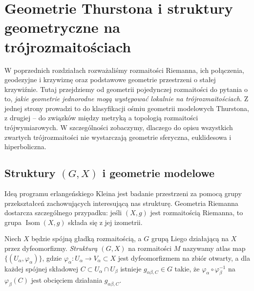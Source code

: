 
\chapter{Geometrie Thurstona i struktury geometryczne na trójrozmaitościach}
\label{chap:geometrie-thurstona}

W poprzednich rozdziałach rozważaliśmy rozmaitości Riemanna, ich połączenia,
geodezyjne i krzywiznę oraz podstawowe geometrie przestrzeni o stałej krzywiźnie.
Tutaj przejdziemy od geometrii pojedynczej rozmaitości do pytania o to,
\emph{jakie geometrie jednorodne mogą występować lokalnie na trójrozmaitościach}.
Z jednej strony prowadzi to do klasyfikacji ośmiu geometrii modelowych
Thurstona, z drugiej -- do związków między metryką a topologią rozmaitości
trójwymiarowych. W szczególności zobaczymy, dlaczego do opisu wszystkich
zwartych trójrozmaitości nie wystarczają geometrie sferyczna, euklidesowa
i hiperboliczna.

\section{Struktury \texorpdfstring{$(G,X)$}{(G,X)} i geometrie modelowe}

Ideą programu erlangeńskiego Kleina jest badanie przestrzeni za pomocą
grupy przekształceń zachowujących interesującą nas strukturę. Geometria
Riemanna dostarcza szczególnego przypadku: jeśli $(X,g)$ jest rozmaitością
Riemanna, to grupa $\operatorname{Isom}(X,g)$ składa się z jej izometrii.

\begin{definicja}[Struktura $(G,X)$]
Niech $X$ będzie spójną gładką rozmaitością, a $G$ grupą Liego działającą na
$X$ przez dyfeomorfizmy. \emph{Strukturą $(G,X)$} na rozmaitości $M$
nazywamy atlas map $\{(U_\alpha,\varphi_\alpha)\}$,
gdzie $\varphi_\alpha\colon U_\alpha\to V_\alpha\subset X$ jest
dyfeomorfizmem na zbiór otwarty, a dla każdej spójnej składowej
$C\subset U_\alpha\cap U_\beta$ istnieje $g_{\alpha\beta,C}\in G$ takie, że
$\varphi_\alpha\circ\varphi_\beta^{-1}$ na $\varphi_\beta(C)$
jest obcięciem działania $g_{\alpha\beta,C}$.
\end{definicja}

